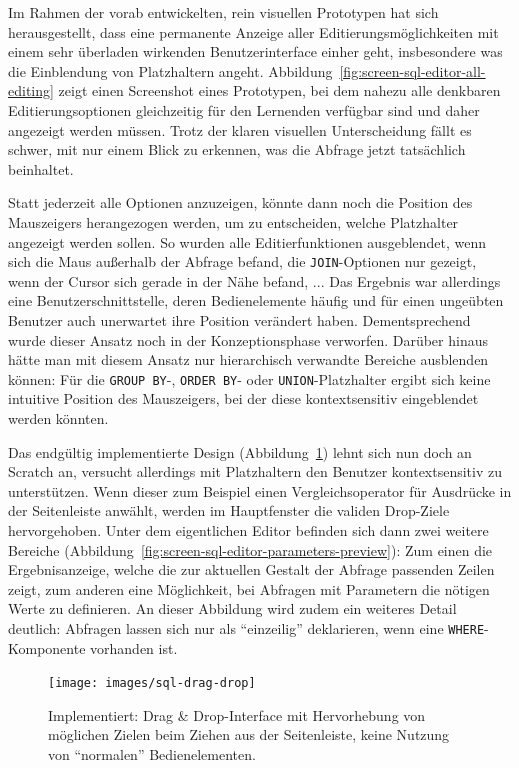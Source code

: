 Im Rahmen der vorab entwickelten, rein visuellen Prototypen hat sich herausgestellt, dass eine permanente Anzeige aller Editierungsmöglichkeiten mit einem sehr überladen wirkenden Benutzerinterface einher geht, insbesondere was die Einblendung von Platzhaltern angeht. Abbildung~\ref{fig:screen-sql-editor-all-editing} zeigt einen Screenshot eines Prototypen, bei dem nahezu alle denkbaren Editierungsoptionen gleichzeitig für den Lernenden verfügbar sind und daher angezeigt werden müssen. Trotz der klaren visuellen Unterscheidung fällt es schwer, mit nur einem Blick zu erkennen, was die Abfrage jetzt tatsächlich beinhaltet.

Statt jederzeit alle Optionen anzuzeigen, könnte dann noch die Position des Mauszeigers herangezogen werden, um zu entscheiden, welche Platzhalter angezeigt werden sollen. So wurden alle Editierfunktionen ausgeblendet, wenn sich die Maus außerhalb der Abfrage befand, die \texttt{JOIN}-Optionen nur gezeigt, wenn der Cursor sich gerade in der Nähe befand, ... Das Ergebnis war allerdings eine Benutzerschnittstelle, deren Bedienelemente häufig und für einen ungeübten Benutzer auch unerwartet ihre Position verändert haben. Dementsprechend wurde dieser Ansatz noch in der Konzeptionsphase verworfen. Darüber hinaus hätte man mit diesem Ansatz nur hierarchisch verwandte Bereiche ausblenden können: Für die \texttt{GROUP BY}-, \texttt{ORDER BY}- oder \texttt{UNION}-Platzhalter ergibt sich keine intuitive Position des Mauszeigers, bei der diese kontextsensitiv eingeblendet werden könnten.

Das endgültig implementierte Design (Abbildung~\ref{fig:screen-sql-editor-drag-drop}) lehnt sich nun doch an Scratch an, versucht allerdings mit Platzhaltern den Benutzer kontextsensitiv zu unterstützen. Wenn dieser zum Beispiel einen Vergleichsoperator für Ausdrücke in der Seitenleiste anwählt, werden im Hauptfenster die validen Drop-Ziele hervorgehoben. Unter dem eigentlichen Editor befinden sich dann zwei weitere Bereiche (Abbildung~\ref{fig:screen-sql-editor-parameters-preview}): Zum einen die Ergebnisanzeige, welche die zur aktuellen Gestalt der Abfrage passenden Zeilen zeigt, zum anderen eine Möglichkeit, bei Abfragen mit Parametern die nötigen Werte zu definieren. An dieser Abbildung wird zudem ein weiteres Detail deutlich: Abfragen lassen sich nur als "`einzeilig"' deklarieren, wenn eine \texttt{WHERE}-Komponente vorhanden ist.

\begin{figure}[t]
  \texttt{[image: images/sql-drag-drop]}
  \caption{Implementiert: Drag \& Drop-Interface mit Hervorhebung von möglichen Zielen beim Ziehen aus der Seitenleiste, keine Nutzung von "`normalen"' Bedienelementen.}
  \label{fig:screen-sql-editor-drag-drop}
\end{figure}

